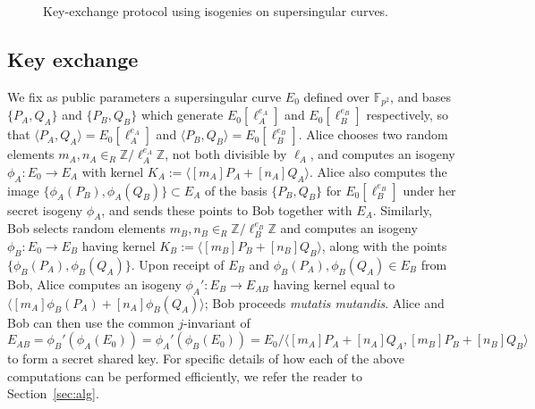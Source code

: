 \documentclass[envcountsect,envcountsame,runningheads]{llncs}   %
\newcommand{\ZZ}{{\mathbb{Z}}}
\newcommand{\FF}{{\mathbb{F}}}
\newcommand{\cyc}[1]{{\langle #1 \rangle}}
\begin{document}
\begin{figure}[t]
\begin{center}
\end{center}
\caption{Key-exchange protocol using isogenies on supersingular
  curves.}
\label{fig:kep}
\end{figure}

\subsection{Key exchange}\label{subsec:kep}

We fix as public parameters a supersingular curve $E_0$ defined over
$\FF_{p^2}$, and bases $\{P_{A},Q_{A}\}$ and $\{P_{B},Q_{B}\}$ which
generate $E_0[\ell_A^{e_A}]$ and $E_0[\ell_B^{e_B}]$ respectively, so
that $\cyc{P_{A}, Q_{A}} = E_0[\ell_A^{e_A}]$ and $\cyc{P_{B}, Q_{B}}
= E_0[\ell_B^{e_B}]$.  Alice chooses two random elements $m_A,n_A
\in_R \ZZ/\ell_A^{e_A}\ZZ$, not both divisible by $\ell_A$, and computes
an isogeny $\phi_A\colon E_0 \to E_A$ with kernel $K_A :=
\cyc{[m_A]P_A+[n_A]Q_A}$. Alice also computes the image
$\{\phi_A(P_B), \phi_A(Q_B)\} \subset E_A$ of the basis
$\{P_{B},Q_{B}\}$ for $E_0[\ell_B^{e_B}]$ under her secret isogeny
$\phi_A$, and sends these points to Bob together with
$E_A$. Similarly, Bob selects random elements $m_B,n_B \in_R
\ZZ/\ell_B^{e_B}\ZZ$ and computes an isogeny $\phi_B\colon E_0 \to E_B$
having kernel $K_B := \cyc{[m_B]P_B+[n_B]Q_B}$, along with the points
$\{\phi_B(P_A), \phi_B(Q_A)\}$. Upon receipt of $E_B$
and $\phi_B(P_A),\phi_B(Q_A) \in E_B$ from Bob, Alice computes an
isogeny $\phi_A' \colon E_B \to E_{AB}$ having kernel equal to
$\cyc{[m_A]\phi_B(P_A)+[n_A]\phi_B(Q_A)}$; Bob proceeds \emph{mutatis
mutandis}.  Alice and Bob can then use the common $j$-invariant of
\[ E_{AB} = \phi_B'(\phi_A(E_0))=  \phi_A'(\phi_B(E_0)) =
E_0/\scriptstyle{\cyc{[m_A]P_A+[n_A]Q_A ,[m_B]P_B+[n_B]Q_B }} \]
to form a secret shared key. For specific details of how each of the
above computations can be performed efficiently, we refer the reader
to Section~\ref{sec:alg}.
\end{document}
